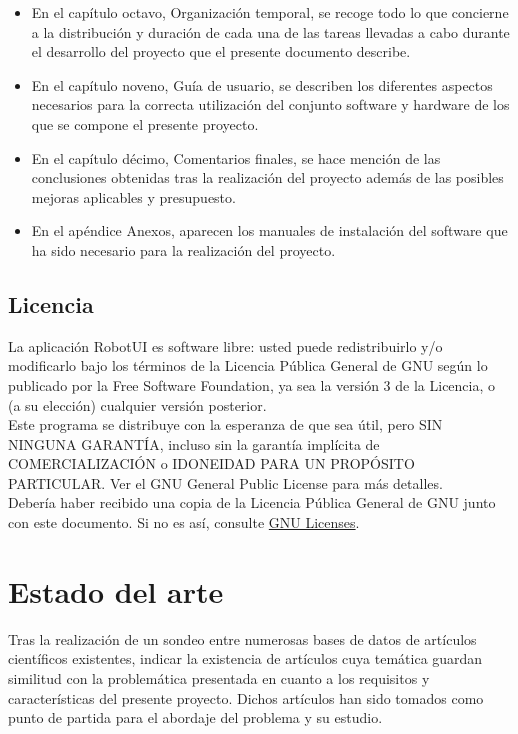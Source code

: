 \documentclass[a4paper,12pt]{article}
\begin{document}
\begin{itemize}
\item En el capítulo octavo, Organización temporal, se recoge todo lo que concierne a la distribución y duración de cada una de las tareas llevadas a cabo durante el desarrollo del proyecto que el presente documento describe.

\item En el capítulo noveno, Guía de usuario, se describen los diferentes aspectos necesarios para la correcta utilización del conjunto software y hardware de los que se compone el presente proyecto.

\item En el capítulo décimo, Comentarios finales, se hace mención de las conclusiones obtenidas tras la realización del proyecto además de las posibles mejoras aplicables y presupuesto.

\item En el apéndice Anexos, aparecen los manuales de instalación del software que ha sido necesario para la realización del proyecto.

\end{itemize}


\subsection{Licencia}

La aplicación RobotUI es software libre: usted puede redistribuirlo y/o modificarlo bajo los términos de la Licencia Pública General de GNU según lo publicado por la Free Software Foundation, ya sea la versión 3 
de la Licencia, o (a su elección) cualquier versión posterior.\\

Este programa se distribuye con la esperanza de que sea útil, pero SIN NINGUNA GARANTÍA, incluso sin la garantía implícita de COMERCIALIZACIÓN o IDONEIDAD PARA UN PROPÓSITO PARTICULAR. Ver el GNU
General Public License para más detalles.\\

Debería haber recibido una copia de la Licencia Pública General de GNU junto con este documento. Si no es así, consulte \href{http://www.gnu.org/licenses/}{GNU Licenses}.\\


\section{ Estado del arte }

Tras la realización de un sondeo entre numerosas bases de datos de artículos científicos existentes, indicar la existencia de artículos cuya temática guardan similitud con la problemática presentada
en cuanto a los requisitos y características del presente proyecto. Dichos artículos han sido tomados como punto de partida para el abordaje del problema y su estudio.\\
\end{document}
